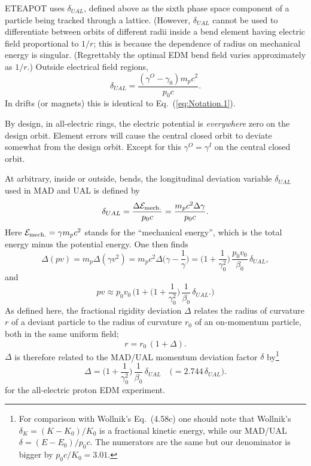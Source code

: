 \documentclass[12]{article}
\begin{document}
ETEAPOT uses $\delta_{UAL}$, defined above as the sixth phase space 
component of a particle being tracked through a lattice. 
(However, $\delta_{UAL}$ cannot be
used to differentiate between orbits of different radii inside a 
bend element having electric field proportional to $1/r$;
this is because the dependence of radius on mechanical energy is 
singular. (Regrettably the optimal EDM bend field varies approximately
as $1/r$.)   Outside electrical field regions,
%
\begin{equation}
\delta_{UAL} = \frac{(\gamma^O-\gamma_0)m_pc^2}{p_0c}.
\label{eq:Notation.3}
\end{equation}
%
In drifts (or magnets) this is identical to Eq.~(\ref{eq:Notation.1}).

By design, in all-electric rings, the electric potential is 
\emph{everywhere} zero on the design orbit. Element errors will cause 
the central closed orbit to deviate somewhat from the design orbit. 
Except for this $\gamma^O=\gamma^I$ on the central closed orbit.

At arbitrary, inside or outside, bends, the longitudinal deviation 
variable $\delta_{UAL}$ used 
in MAD and UAL is defined by
%
\begin{equation}
\delta_{UAL}
 = 
\frac{\Delta\mathcal{E}_{\rm mech.}}{p_0c}
 =
\frac{m_pc^2\Delta\gamma}{p_0c}.
\label{eq:chromatic.2}
\end{equation}
%
Here $\mathcal{E}_{\rm mech.}=\gamma m_pc^2$ stands for the 
``mechanical energy'', which is the total energy minus the
potential energy. One then finds
%
\begin{equation}
\Delta(pv)
 = 
m_p\Delta(\gamma v^2)
 =
m_pc^2\Delta
\Big(
\gamma - \frac{1}{\gamma}
\Big)
 =
\Big(
1 + \frac{1}{\gamma_0^2}
\Big)\,
\frac{p_0v_0}{\beta_0}\,\delta_{UAL},
\label{eq:chromatic.3}
\end{equation}
%
and
%
\begin{equation}
pv
 \approx
p_0v_0\,
\bigg(
1 + \Big(1 + \frac{1}{\gamma_0^2}\Big)\,\frac{1}{\beta_0}\,\delta_{UAL}.
\bigg)
\label{eq:chromatic.4}
\end{equation}
%
As defined here, the fractional rigidity deviation $\Delta$ relates the
radius of curvature $r$ of a deviant particle to the 
radius of curvature $r_0$ of an on-momentum particle, both in the
same uniform field;
%
\begin{equation}
r = r_0\,(1+\Delta).
\label{eq:chromatic.6p}
\end{equation}
%
$\Delta$ is therefore related to the MAD/UAL momentum deviation 
factor $\delta$ by\footnote{For comparison with Wollnik's
Eq.~(4.58c) one should note that Wollnik's 
$\delta_K=(K-K_0)/K_0$ is a fractional kinetic energy,
while our MAD/UAL $\delta=(E-E_0)/p_0c$. The numerators are
the same but our denominator is bigger by $p_0c/K_0=3.01$.}
%
\begin{equation}
\Delta 
 =
\Big(1 + \frac{1}{\gamma_0^2}\Big)\,\frac{1}{\beta_0}\,\delta_{UAL}
\quad
\big(
 = 
2.744\,\delta_{UAL}
\big).
\label{eq:chromatic.6q}
\end{equation}
%
for the all-electric proton EDM experiment. 
\end{document}
